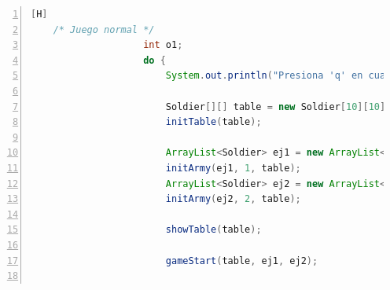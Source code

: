\documentclass{article}
\begin{document}
	\begin{lstlisting}[language=java,caption={Menú de Partida Rápida}, numbers=left][H]
	/* Juego normal */
                    int o1;
                    do {
                        System.out.println("Presiona 'q' en cualquier momento para salir");

                        Soldier[][] table = new Soldier[10][10];
                        initTable(table);

                        ArrayList<Soldier> ej1 = new ArrayList<Soldier>();
                        initArmy(ej1, 1, table);
                        ArrayList<Soldier> ej2 = new ArrayList<Soldier>();
                        initArmy(ej2, 2, table);

                        showTable(table);

                        gameStart(table, ej1, ej2);


\end{lstlisting}
\end{document}
